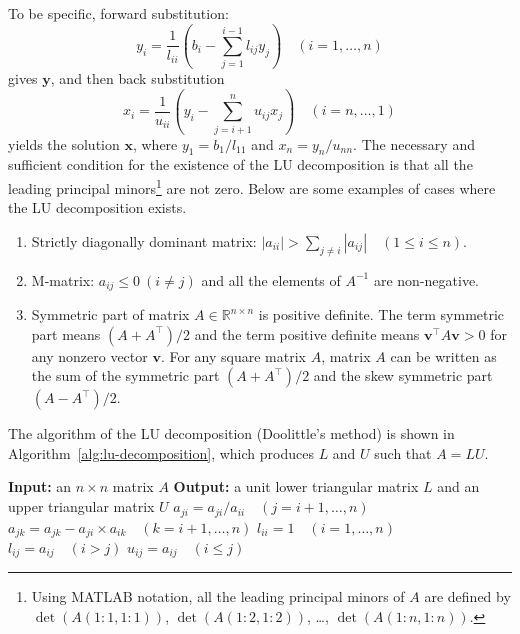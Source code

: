 {To be specific, forward substitution:}
\[
y_i=\frac1{l_{ii}}\left(b_i-\sum_{j=1}^{i-1}l_{ij}y_j\right)\quad(i=1,\ldots,n)
\]
{gives $\bm y$, and then back substitution}
\[
x_i=\frac1{u_{ii}}\left(y_i-\sum_{j=i+1}^n u_{ij}x_j\right)\quad(i=n,\ldots,1)
\]
{yields the solution $\bm x$, where $y_1=b_1/l_{11}$ and $x_n=y_n/u_{nn}$.}
{The necessary and sufficient condition for the existence of the LU decomposition is that all the leading principal minors\footnote{Using MATLAB notation, all the leading principal minors of $A$ are defined by $\det(A(1:1,1:1))$, $\det(A(1:2,1:2))$, \ldots, $\det(A(1:n,1:n))$.} are not zero. Below are some examples of cases where the LU decomposition exists.}
\begin{enumerate}
\item {Strictly diagonally dominant matrix:} $|a_{ii}|>\sum_{j\ne i}|a_{ij}|\quad(1\le i\le n)$.
\item {M-matrix: $a_{ij}\le0\ (i\ne j)$ and all the elements of $A^{-1}$ are non-negative.}
\item {Symmetric part of matrix $A\in\mathbb R^{n\times n}$ is positive definite. The term symmetric part means $(A+A^\top)/2$ and the term positive definite means $\bm v^\top A\bm v>0$ for any nonzero vector $\bm v$. For any square matrix $A$, matrix $A$ can be written as the sum of the symmetric part $(A+A^\top)/2$ and the skew symmetric part $(A-A^\top)/2$.}
\end{enumerate}
{The algorithm of the LU decomposition (Doolittle's method) is shown in Algorithm~\ref{alg:lu-decomposition}, which produces $L$ and $U$ such that $A=LU$.}
\begin{algorithm}[H]
\caption{{The LU decomposition}}\label{alg:lu-decomposition}
\begin{algorithmic}[1]
\Statex \textbf{Input:} {an $n\times n$ matrix $A$}
\Statex \textbf{Output:} {a unit lower triangular matrix $L$ and an upper triangular matrix $U$}
\State $a_{ji}=a_{ji}/a_{ii}\quad(j=i+1,\ldots,n)$
\State $a_{jk}=a_{jk}-a_{ji}\times a_{ik}\quad(k=i+1,\ldots,n)$
\EndFor
\EndFor
\State $l_{ii}=1\quad(i=1,\ldots,n)$
\State $l_{ij}=a_{ij}\quad(i>j)$
\State $u_{ij}=a_{ij}\quad(i\le j)$
\end{algorithmic}
\end{algorithm}
